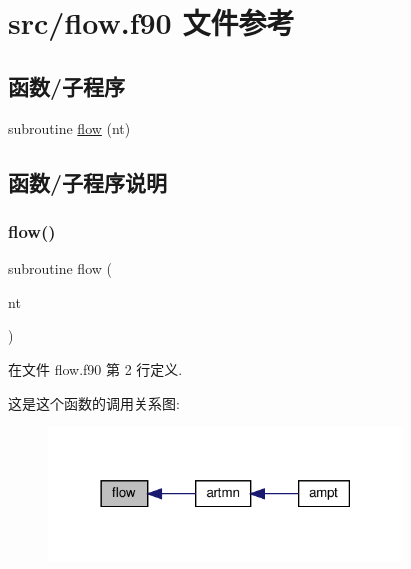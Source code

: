 \hypertarget{flow_8f90}{}\section{src/flow.f90 文件参考}
\label{flow_8f90}
\subsection*{函数/子程序}
\begin{DoxyCompactItemize}
\item 
subroutine \mbox{\hyperlink{flow_8f90_af14dc9debd1f971c344a3cba2be2ed46}{flow}} (nt)
\end{DoxyCompactItemize}


\subsection{函数/子程序说明}
\mbox{\label{flow_8f90_af14dc9debd1f971c344a3cba2be2ed46}} 
\subsubsection{\texorpdfstring{flow()}{flow()}}
{\footnotesize\ttfamily subroutine flow (\begin{DoxyParamCaption}\item[{}]{nt }\end{DoxyParamCaption})}



在文件 flow.\+f90 第 2 行定义.

这是这个函数的调用关系图\+:
\nopagebreak
\begin{figure}[H]
\begin{center}
\leavevmode
\includegraphics[width=266pt]{flow_8f90_af14dc9debd1f971c344a3cba2be2ed46_icgraph}
\end{center}
\end{figure}
